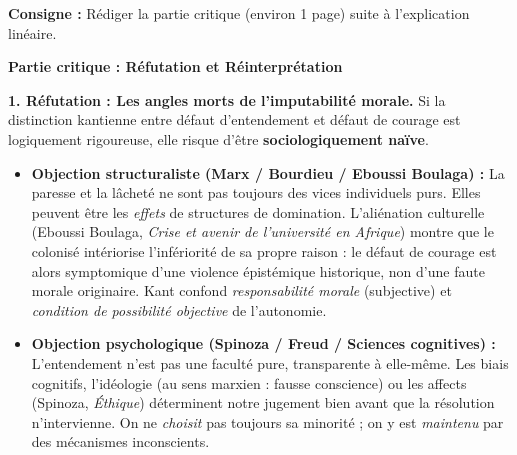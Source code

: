 \documentclass[11pt]{article}
\newcommand{\cle}[1]{{\popxbold\color{popdark}#1}}
\begin{document}
\begin{exoresolu}
\textbf{Consigne :} Rédiger la partie critique (environ 1 page) suite à l'explication linéaire.

\tcblower
\textbf{Partie critique : Réfutation et Réinterprétation}

\textbf{1. Réfutation : Les angles morts de l'imputabilité morale.}
Si la distinction kantienne entre \guillemotleft défaut d'entendement \guillemotright et \guillemotleft défaut de courage \guillemotright est logiquement rigoureuse, elle risque d'être \textbf{sociologiquement naïve}. 
\begin{itemize}
    \item \textbf{Objection structuraliste (Marx / Bourdieu / \cle{Eboussi Boulaga}) :} La \guillemotleft paresse \guillemotright et la \guillemotleft lâcheté \guillemotright ne sont pas toujours des vices individuels purs. Elles peuvent être les \emph{effets} de structures de domination. L'aliénation culturelle (\cle{Eboussi Boulaga}, \emph{Crise et avenir de l'université en Afrique}) montre que le colonisé intériorise l'infériorité de sa propre raison : le \guillemotleft défaut de courage \guillemotright est alors symptomique d'une \cle{violence épistémique} historique, non d'une faute morale originaire. Kant confond \emph{responsabilité morale} (subjective) et \emph{condition de possibilité objective} de l'autonomie.
    \item \textbf{Objection psychologique (Spinoza / Freud / Sciences cognitives) :} L'entendement n'est pas une faculté pure, transparente à elle-même. Les \cle{biais cognitifs}, l'\cle{idéologie} (au sens marxien : fausse conscience) ou les \cle{affects} (Spinoza, \emph{Éthique}) déterminent notre jugement bien avant que la \guillemotleft résolution \guillemotright n'intervienne. On ne \emph{choisit} pas toujours sa minorité ; on y est \emph{maintenu} par des mécanismes inconscients.
\end{itemize}


\end{exoresolu}
\end{document}
